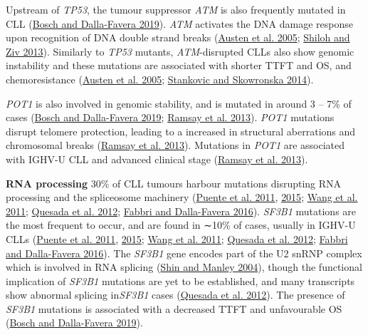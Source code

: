 \documentclass[11pt, a4paper, twosided]{book}
\begin{document}
Upstream of \emph{TP53}, the tumour suppressor \emph{ATM} is also frequently mutated in CLL (\protect\hyperlink{ref-Bosch2019}{Bosch and Dalla-Favera 2019}). \emph{ATM} activates the DNA damage response upon recognition of DNA double strand breaks (\protect\hyperlink{ref-Austen2005}{Austen et al. 2005}; \protect\hyperlink{ref-Shiloh2013}{Shiloh and Ziv 2013}). Similarly to \emph{TP53} mutants, \emph{ATM}-disrupted CLLs also show genomic instability and these mutations are associated with shorter TTFT and OS, and chemoresistance (\protect\hyperlink{ref-Austen2005}{Austen et al. 2005}; \protect\hyperlink{ref-Stankovic2014}{Stankovic and Skowronska 2014}).

\emph{POT1} is also involved in genomic stability, and is mutated in around 3 -- 7\% of cases (\protect\hyperlink{ref-Bosch2019}{Bosch and Dalla-Favera 2019}; \protect\hyperlink{ref-Ramsay2013b}{Ramsay et al. 2013}). \emph{POT1} mutations disrupt telomere protection, leading to a increased in structural aberrations and chromosomal breaks (\protect\hyperlink{ref-Ramsay2013b}{Ramsay et al. 2013}). Mutations in \emph{POT1} are associated with IGHV-U CLL and advanced clinical stage (\protect\hyperlink{ref-Ramsay2013b}{Ramsay et al. 2013}).

\textbf{RNA processing}
30\% of CLL tumours harbour mutations disrupting RNA processing and the spliceosome machinery (\protect\hyperlink{ref-Puente2011}{Puente et al. 2011}, \protect\hyperlink{ref-Puente2015}{2015}; \protect\hyperlink{ref-Wang2011}{Wang et al. 2011}; \protect\hyperlink{ref-Quesada2012}{Quesada et al. 2012}; \protect\hyperlink{ref-Fabbri2016}{Fabbri and Dalla-Favera 2016}).
\emph{SF3B1} mutations are the most frequent to occur, and are found in ∼10\% of cases, usually in IGHV-U CLLs (\protect\hyperlink{ref-Puente2011}{Puente et al. 2011}, \protect\hyperlink{ref-Puente2015}{2015}; \protect\hyperlink{ref-Wang2011}{Wang et al. 2011}; \protect\hyperlink{ref-Quesada2012}{Quesada et al. 2012}; \protect\hyperlink{ref-Fabbri2016}{Fabbri and Dalla-Favera 2016}). The \emph{SF3B1} gene encodes part of the U2 snRNP complex which is involved in RNA splicing (\protect\hyperlink{ref-Shin2004}{Shin and Manley 2004}), though the functional implication of \emph{SF3B1} mutations are yet to be established, and many transcripts show abnormal splicing in\emph{SF3B1} cases (\protect\hyperlink{ref-Quesada2012}{Quesada et al. 2012}). The presence of \emph{SF3B1} mutations is associated with a decreased TTFT and unfavourable OS (\protect\hyperlink{ref-Bosch2019}{Bosch and Dalla-Favera 2019}).
\end{document}
